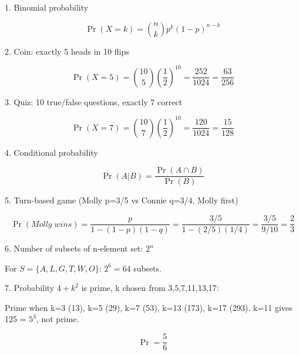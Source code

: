 1. Binomial probability

$$ \Pr(X=k) = \binom{n}{k} p^k (1-p)^{n-k} $$

2. Coin: exactly 5 heads in 10 flips

$$ \Pr(X=5) = \binom{10}{5} \left(\frac{1}{2}\right)^{10} = \frac{252}{1024} = \frac{63}{256} $$

3. Quiz: 10 true/false questions, exactly 7 correct

$$ \Pr(X=7) = \binom{10}{7} \left(\frac{1}{2}\right)^{10} = \frac{120}{1024} = \frac{15}{128} $$

4. Conditional probability

$$ \Pr(A | B) = \frac{\Pr(A \cap B)}{\Pr(B)} $$

5. Turn-based game (Molly p=3/5 vs Connie q=3/4, Molly first)

$$ \Pr(Molly \; wins) = \frac{p}{1-(1-p)(1-q)} = \frac{3/5}{1-(2/5)(1/4)} = \frac{3/5}{9/10} = \frac{2}{3} $$

6. Number of subsets of n-element set: $2^n$

For $S = \{A,L,G,T,W,O\}$: $2^6 = 64$ subsets.

7. Probability $4 + k^2$ is prime, k chosen from {3,5,7,11,13,17}:

Prime when k=3 (13), k=5 (29), k=7 (53), k=13 (173), k=17 (293). k=11 gives 125 = $5^3$, not prime.

$$ \Pr = \frac{5}{6} $$
